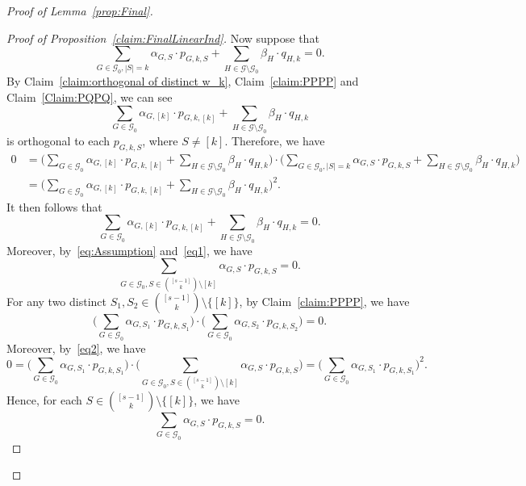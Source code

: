 \documentclass[11pt]{article}
\theoremstyle{definition}
\begin{document}
\begin{proof}[Proof of Lemma~\ref{prop:Final}]
\begin{proof}[Proof of Proposition~\ref{claim:FinalLinearInd}]
Now suppose that
\begin{equation}\label{eq:Assumption}
    \sum_{G\in \mathcal{G}_{0},|S|=k}\alpha_{G,S}\cdot p_{G,k,S}+\sum_{H\in \mathcal{G}\setminus\mathcal{G}_{0}}\beta_{H}\cdot q_{H,k}=0.
\end{equation}
By Claim~\ref{claim:orthogonal of distinct w_k}, Claim~\ref{claim:PPPP} and Claim~\ref{Claim:PQPQ}, we can see
\[\sum_{G\in \mathcal{G}_{0}}\alpha_{G,[k]}\cdot p_{G,k,[k]}+\sum_{H\in \mathcal{G}\setminus\mathcal{G}_{0}}\beta_{H}\cdot q_{H,k}\] is orthogonal to each $p_{G,k,S}$, where $S\neq [k]$. Therefore, we have
\[
\begin{aligned}
0&=\bigg(\sum_{G\in \mathcal{G}_{0}}\alpha_{G,[k]}\cdot p_{G,k,[k]}+\sum_{H\in \mathcal{G}\setminus\mathcal{G}_{0}}\beta_{H}\cdot q_{H,k}\bigg)\cdot\bigg(\sum_{G\in \mathcal{G}_{0},|S|=k}\alpha_{G,S}\cdot p_{G,k,S}+\sum_{H\in \mathcal{G}\setminus\mathcal{G}_{0}}\beta_{H}\cdot q_{H,k}\bigg)\\
&=\bigg(\sum_{G\in \mathcal{G}_{0}}\alpha_{G,[k]}\cdot p_{G,k,[k]}+\sum_{H\in \mathcal{G}\setminus\mathcal{G}_{0}}\beta_{H}\cdot q_{H,k}\bigg)^2.
\end{aligned}
\]
   It then follows that
     \begin{equation}\label{eq1}
         \sum_{G\in \mathcal{G}_{0}}\alpha_{G,[k]}\cdot p_{G,k,[k]}+\sum_{H\in \mathcal{G}\setminus\mathcal{G}_{0}}\beta_{H}\cdot q_{H,k}=0.
     \end{equation}
     Moreover, by~\eqref{eq:Assumption} and~\eqref{eq1}, we have
      \begin{equation}\label{eq2}
         \sum_{G\in \mathcal{G}_{0},S\in \binom{[s-1]}{k}\setminus {[k]}}\alpha_{G,S}\cdot p_{G,k,S}=0.
     \end{equation}
     For any two distinct $S_1,S_2\in \binom{[s-1]}{k}\setminus \{[k]\}$, by Claim~\ref{claim:PPPP}, we have 
     $$\bigg(\sum_{G\in \mathcal{G}_{0}}\alpha_{G,S_1}\cdot p_{G,k,S_1}\bigg)\cdot \bigg(\sum_{G\in \mathcal{G}_{0}}\alpha_{G,S_2}\cdot p_{G,k,S_2}\bigg)=0.$$
     Moreover, by~\eqref{eq2}, we have
     $$0=\bigg(\sum_{G\in \mathcal{G}_{0}}\alpha_{G,S_1}\cdot p_{G,k,S_1}\bigg)\cdot\bigg(\sum_{G\in \mathcal{G}_{0},S\in \binom{[s-1]}{k}\setminus {[k]}}\alpha_{G,S}\cdot p_{G,k,S}\bigg)=\bigg(\sum_{G\in \mathcal{G}_{0}}\alpha_{G,S_1}\cdot p_{G,k,S_1}\bigg)^2.$$
     Hence, for each $S\in \binom{[s-1]}{k}\setminus\{[k]\}$, we have
     \begin{equation}\label{eq3}
         \sum_{G\in \mathcal{G}_{0}}\alpha_{G,S}\cdot p_{G,k,S}=0.
     \end{equation}

\end{proof}
\end{proof}
\end{document}
